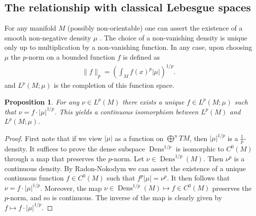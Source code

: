 \documentclass[12pt]{amsart}
\newtheorem{prop}[thm]{Proposition}
\DeclareMathOperator{\Dens}{Dens}
\begin{document}
\subsection{The relationship with classical Lebesgue spaces}
\label{sec:classical_Lebesgue}
For any manifold $M$ (possibly non-orientable) one can assert the existence of a smooth non-negative density $\mu$ .
The choice of a non-vanishing density is unique only up to multiplication by a non-vanishing function.
In any case, upon choosing $\mu$ the $p$-norm on a bounded function $f$ is defined as
\begin{align*}
	\| f \|_p =  \left( \int_M f(x)^p |\mu| \right)^{1/p}.
\end{align*}
and $L^p(M ; \mu)$ is the completion of this function space.

\begin{prop}
	For any $\nu \in L^p(M)$ there exists a unique $f \in L^p(M ; \mu)$ such that $\nu = f \cdot |\mu|^{1/p}$.
	This yields a continuous isomorphism between $L^p(M)$ and $L^p(M ; \mu)$.
\end{prop}
\begin{proof}
	First note that if we view $|\mu|$ as a function on $\bigoplus^n TM$, then $|\mu|^{1/p}$ is a $\frac{1}{p}$-density.
	It suffices to prove the dense subspace $\Dens^{1/p}$ is isomorphic to $C^0(M)$ through a map that preserves the $p$-norm.
	Let $\nu \in \Dens^{1/p}(M)$.  Then $\nu^p$ is a continuous density.
	By Radon-Nokodym we can assert the existence of a unique continuous function $f \in C^0(M)$ such that $f^{p} |\mu| = \nu^p$.
	It then follows that $\nu = f \cdot | \mu |^{1/p}$.
	Moreover, the map $\nu \in \Dens^{1/p}(M) \mapsto f \in C^0(M)$ preserves the $p$-norm, and so is continuous.
	The inverse of the map is clearly given by $f \mapsto f \cdot |\mu|^{1/p}$.
\end{proof}
\end{document}
